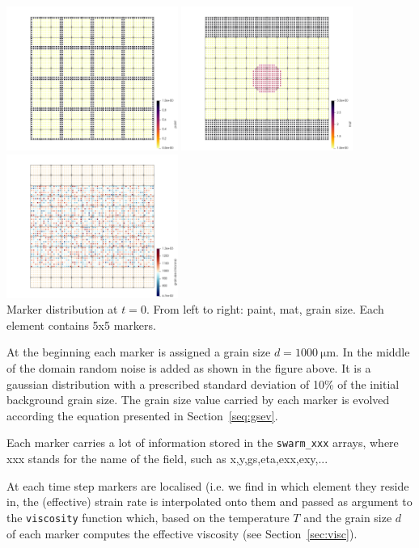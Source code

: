 \documentclass[a4paper]{article}
\begin{document}
\begin{center}
\includegraphics[width=5.6cm]{images/paint}
\includegraphics[width=5.6cm]{images/mats}
\includegraphics[width=5.6cm]{images/gs}\\
Marker distribution at $t=0$. From left to right: paint, mat, grain size.
Each element contains 5x5 markers.
\end{center}

At the beginning each marker is assigned a grain size $d=1000~\si{\micro\meter}$.
In the middle of the domain random noise is added as shown in the figure above.
It is a gaussian distribution with a prescribed standard deviation of 10\%
of the initial background grain size.
The grain size value carried by each marker is evolved according the 
equation presented in Section~\ref{seq:gsev}.

Each marker carries a lot of information stored in the \lstinline{swarm_xxx}
arrays, where xxx stands for the name of the field, such as x,y,gs,eta,exx,exy,... 

At each time step markers are localised (i.e. we find in which element they reside
in, the (effective) strain rate is interpolated onto them and passed as 
argument to the \lstinline{viscosity} function which, based on the 
temperature $T$ and the grain size $d$ of each marker computes the 
effective viscosity (see Section~\ref{sec:visc}).
\end{document}
